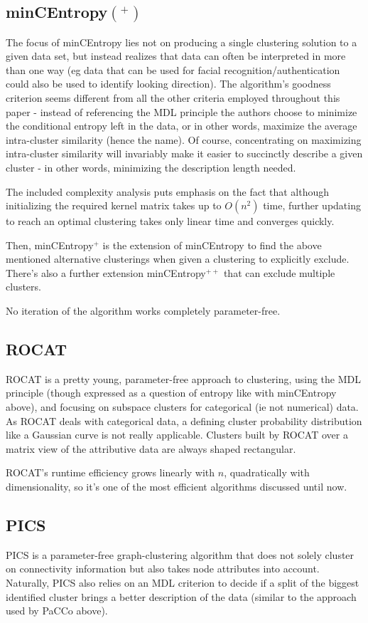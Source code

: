 \documentclass[conference]{IEEEtran}
\begin{document}
\subsection{minCEntropy$ (^+) $}
The focus of minCEntropy lies not on producing a single clustering solution to a given data set, but instead realizes that data can often be interpreted in more than one way (eg data that can be used for facial recognition/authentication could also be used to identify looking direction). The algorithm's goodness criterion seems different from all the other criteria employed throughout this paper - instead of referencing the MDL principle the authors choose to minimize the conditional entropy left in the data, or in other words, maximize the average intra-cluster similarity (hence the name). Of course, concentrating on maximizing intra-cluster similarity will invariably make it easier to succinctly describe a given cluster - in other words, minimizing the description length needed.

The included complexity analysis puts emphasis on the fact that although initializing the required kernel matrix takes up to $ O(n^2) $ time, further updating to reach an optimal clustering takes only linear time and converges quickly.

Then, minCEntropy$ ^+ $ is the extension of minCEntropy to find the above mentioned alternative clusterings when given a clustering to explicitly exclude. There's also a further extension minCEntropy$ ^{++} $ that can exclude multiple clusters.

No iteration of the algorithm works completely parameter-free.

\subsection{ROCAT}
ROCAT is a pretty young, parameter-free approach to clustering, using the MDL principle (though expressed as a question of entropy like with minCEntropy above), and focusing on subspace clusters for categorical (ie not numerical) data. As ROCAT deals with categorical data, a defining cluster probability distribution like a Gaussian curve is not really applicable. Clusters built by ROCAT over a matrix view of the attributive data are always shaped rectangular.

ROCAT's runtime efficiency grows linearly with $ n $, quadratically with dimensionality, so it's one of the most efficient algorithms discussed until now.

\subsection{PICS}
PICS is a parameter-free graph-clustering algorithm that does not solely cluster on connectivity information but also takes node attributes into account. Naturally, PICS also relies on an MDL criterion to decide if a split of the biggest identified cluster brings a better description of the data (similar to the approach used by PaCCo above).
\end{document}

